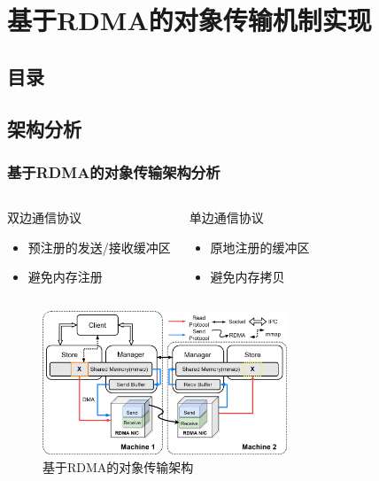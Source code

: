 \section{基于RDMA的对象传输机制实现}

\subsection*{目录}

\subsection*{架构分析}
\begin{frame}
	\frametitle{基于RDMA的对象传输架构分析}

	\vspace{-1.6em}
	\begin{columns}[t]
		\begin{block}{双边通信协议}
			\begin{itemize}
				\item 预注册的发送/接收缓冲区
				\item 避免内存注册
			\end{itemize}
		\end{block}
		\begin{block}{单边通信协议}
			\begin{itemize}
				\item 原地注册的缓冲区
				\item 避免内存拷贝
			\end{itemize}
		\end{block}
	\end{columns}

	\begin{figure}
		\centering
		\includegraphics[width=0.65\textwidth]{image/chap03/rdma_arch.png}
		\caption{基于RDMA的对象传输架构}
	\end{figure}

\end{frame}

